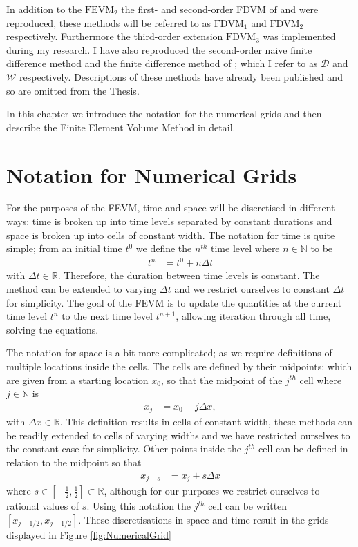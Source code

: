 In addition to the $\text{FEVM}_2$ the first- and second-order FDVM of \citet{Hank-etal-2010-2034} and \citet{Zoppou-etal-2017} were reproduced, these methods will be referred to as $\text{FDVM}_1$ and $\text{FDVM}_2$ respectively. Furthermore the third-order extension $\text{FDVM}_3$ was implemented during my research. I have also reproduced the second-order naive finite difference method \cite{Pitt-J-2014} and the finite difference method of \citet{El-etal-2006}; which I refer to as $\mathcal{D}$ and $\mathcal{W}$ respectively. Descriptions of these methods have already been published \cite{Zoppou-etal-2017,Pitt-2018-61} and so are omitted from the Thesis.  

In this chapter we introduce the notation for the numerical grids and then describe the Finite Element Volume Method in detail.

\section{Notation for Numerical Grids}

For the purposes of the FEVM, time and space will be discretised in different ways; time is broken up into time levels separated by constant durations and space is broken up into cells of constant width. The notation for time is quite simple; from an initial time $t^0$ we define the $n^{th}$ time level where $n \in \mathbb{N}$ to be
\begin{align*}
t^n &= t^0 + n \Delta t
\end{align*}
with $\Delta t \in \mathbb{R}$. Therefore, the duration between time levels is constant. The method can be extended to varying $\Delta t$ and we restrict ourselves to constant $\Delta t$ for simplicity. The goal of the FEVM is to update the quantities at the current time level $t^n$ to the next time level $t^{n+1}$, allowing iteration through all time, solving the equations. 

The notation for space is a bit more complicated; as we require definitions of multiple locations inside the cells. The cells are defined by their midpoints; which are given from a starting location $x_0$, so that the midpoint of the $j^{th}$ cell where $j \in \mathbb{N}$ is
\begin{align*}
x_j &= x_0 + j \Delta x,
\end{align*}
with $\Delta x \in \mathbb{R}$. This definition results in cells of constant width, these methods can be readily extended to cells of varying widths and we have restricted ourselves to the constant case for simplicity. Other points inside the $j^{th}$ cell can be defined in relation to the midpoint so that 
\begin{align*}
x_{j + s} &= x_j + s \Delta x
\end{align*}
where $s \in \left[-\frac{1}{2} , \frac{1}{2}\right]  \subset\mathbb{R}$, although for our purposes we restrict ourselves to rational values of $s$. Using this notation the $j^{th}$ cell can be written $\left[x_{j -1/2},x_{j + 1/2}\right]$. These discretisations in space and time result in the grids displayed in Figure \ref{fig:NumericalGrid}

